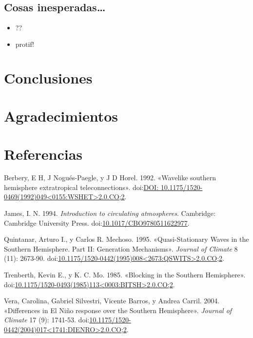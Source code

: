 \documentclass[spanish,a4paper]{book}
\providecommand{\tightlist}{%
  \setlength{\itemsep}{0pt}\setlength{\parskip}{0pt}}
\begin{document}
\section{Cosas inesperadas\ldots{}}\label{cosas-inesperadas}

\begin{itemize}
\tightlist
\item
  ??
\item
  protif!
\end{itemize}

\chapter{Conclusiones}\label{conclusiones}

\chapter{Agradecimientos}\label{agradecimientos}

\chapter*{Referencias}\label{referencias}

\hypertarget{refs}{}
\hypertarget{ref-Berbery1992}{}
Berbery, E H, J Nogués-Paegle, y J D Horel. 1992. «Wavelike southern
hemisphere extratropical teleconnections».
doi:\href{https://doi.org/DOI:\%2010.1175/1520-0469(1992)049\%3C0155:WSHET\%3E2.0.CO;2}{DOI: 10.1175/1520-0469(1992)049\textless{}0155:WSHET\textgreater{}2.0.CO;2}.

\hypertarget{ref-James}{}
James, I. N. 1994. \emph{Introduction to circulating atmospheres}.
Cambridge: Cambridge University Press.
doi:\href{https://doi.org/10.1017/CBO9780511622977}{10.1017/CBO9780511622977}.

\hypertarget{ref-Quintanar1995}{}
Quintanar, Arturo I., y Carlos R. Mechoso. 1995. «Quasi-Stationary Waves
in the Southern Hemisphere. Part II: Generation Mechanisms».
\emph{Journal of Climate} 8 (11): 2673-90.
doi:\href{https://doi.org/10.1175/1520-0442(1995)008\%3C2673:QSWITS\%3E2.0.CO;2}{10.1175/1520-0442(1995)008\textless{}2673:QSWITS\textgreater{}2.0.CO;2}.

\hypertarget{ref-Trenberth1985}{}
Trenberth, Kevin E., y K. C. Mo. 1985. «Blocking in the Southern
Hemisphere».
doi:\href{https://doi.org/10.1175/1520-0493(1985)113\%3C0003:BITSH\%3E2.0.CO;2}{10.1175/1520-0493(1985)113\textless{}0003:BITSH\textgreater{}2.0.CO;2}.

\hypertarget{ref-Vera2004}{}
Vera, Carolina, Gabriel Silvestri, Vicente Barros, y Andrea Carril.
2004. «Differences in El Niño response over the Southern Hemisphere».
\emph{Journal of Climate} 17 (9): 1741-53.
doi:\href{https://doi.org/10.1175/1520-0442(2004)017\%3C1741:DIENRO\%3E2.0.CO;2}{10.1175/1520-0442(2004)017\textless{}1741:DIENRO\textgreater{}2.0.CO;2}.
\end{document}
